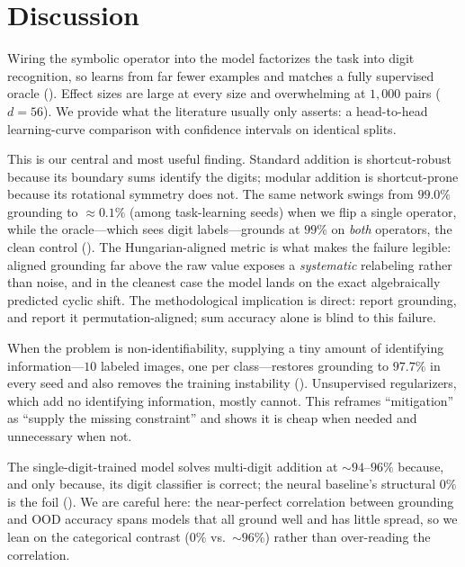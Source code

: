 \section{Discussion}
\label{sec:discussion}

 Wiring the symbolic operator into the
model factorizes the task into digit recognition, so \nesy learns from far fewer examples and matches a
fully supervised oracle (). Effect sizes are large at every size and overwhelming at
$1{,}000$ pairs ($d{=}56$). We provide what the literature usually only asserts: a head-to-head
learning-curve comparison with confidence intervals on identical splits.

 This
is our central and most useful finding. Standard addition is shortcut-robust because its boundary sums
identify the digits; modular addition is shortcut-prone because its rotational symmetry does not. The
same network swings from $99.0\%$ grounding to $\approx0.1\%$ (among task-learning seeds) when we flip a
single operator, while the oracle---which sees digit labels---grounds at $99\%$ on \emph{both} operators,
the clean control (). The Hungarian-aligned metric is what makes the failure legible:
aligned grounding far above the raw value exposes a \emph{systematic} relabeling rather than noise, and
in the cleanest case the model lands on the exact algebraically predicted cyclic shift. The
methodological implication is direct: report grounding, and report it permutation-aligned; sum accuracy
alone is blind to this failure.

 When the problem is non-identifiability, supplying a tiny amount
of identifying information---$10$ labeled images, one per class---restores grounding to $97.7\%$ in every
seed and also removes the training instability (). Unsupervised regularizers, which add no
identifying information, mostly cannot. This reframes ``mitigation'' as ``supply the missing constraint''
and shows it is cheap when needed and unnecessary when not.

 The single-digit-trained
\nesy model solves multi-digit addition at ${\sim}94$--$96\%$ because, and only because, its digit
classifier is correct; the neural baseline's structural $0\%$ is the foil (). We are
careful here: the near-perfect correlation between grounding and OOD accuracy spans models that all
ground well and has little spread, so we lean on the categorical contrast ($0\%$ vs.\ ${\sim}96\%$)
rather than over-reading the correlation.

